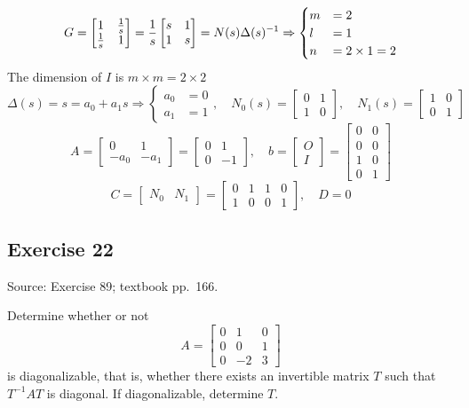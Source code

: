 \documentclass[12pt,a4paper]{article}
\newlength{\questionroom}
\newenvironment{questionprompt}{%
  \begin{lrbox}{\questionbox}\begin{minipage}{\linewidth}%
}{%
  \end{minipage}\end{lrbox}%
  \setlength{\questionroom}{\dimexpr\ht\questionbox+\dp\questionbox+5.2cm\relax}%
  \ifdim\questionroom>\textheight\setlength{\questionroom}{\textheight}\fi
  \Needspace{\questionroom}%
  \noindent\usebox{\questionbox}\par
}
\begin{document}
\[
G = \begin{bmatrix}
	1 & {1\over s} \\
	{1\over s} & 1
\end{bmatrix} = {1\over s} \begin{bmatrix}
	s & 1 \\ 1 & s
\end{bmatrix} = N(s)\Delta(s)^{-1} \Rightarrow \begin{cases}
m &= 2 \\
l &= 1 \\
n &= 2 \times 1 = 2
\end{cases}
\]
The dimension of $I$ is $m\times m = 2 \times 2$
\[
\Delta (s) = s = a_0 + a_1 s \Rightarrow \begin{cases}
	a_0 &= 0 \\ a_1 &= 1
\end{cases},\quad  N_0(s) =\begin{bmatrix}
0 & 1 \\ 1 & 0
\end{bmatrix},\quad N_1(s) = \begin{bmatrix}
1 & 0 \\ 0 & 1
\end{bmatrix}
\]
\[
A = \begin{bmatrix}
	0 & 1 \\
	-a_0 & -a_1
\end{bmatrix} = \begin{bmatrix}
0 & 1 \\ 0 & -1
\end{bmatrix}, \quad b = \begin{bmatrix}
 O \\ I
\end{bmatrix} = \begin{bmatrix}
0 & 0 \\
0 & 0 \\
1 & 0 \\
0 & 1
\end{bmatrix}
\]
\[
C = \begin{bmatrix}
	N_0 & N_1
\end{bmatrix} = \begin{bmatrix}
0 & 1 & 1 & 0 \\ 1 & 0 & 0 & 1
\end{bmatrix}, \quad D = 0
\]




\vspace{3.5cm}


\begin{questionprompt}
\section*{Exercise 22}
\label{practice:22}
{\small Source: Exercise 89; textbook pp.~166.}\par
Determine whether or not
\[A=\begin{bmatrix}0&1&0\\0&0&1\\0&-2&3\end{bmatrix}\]
is diagonalizable, that is, whether there exists an invertible matrix $T$ such that $T^{-1}AT$ is diagonal. If diagonalizable, determine $T$.
\end{questionprompt}
\end{document}
